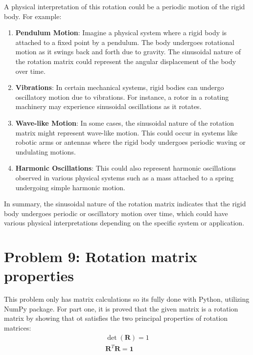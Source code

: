 \documentclass[conference]{IEEEtran}
\begin{document}
A physical interpretation of this rotation could be a periodic motion of the rigid body. For example:

\begin{enumerate}
    \item \textbf{Pendulum Motion}: Imagine a physical system where a rigid body is attached to a fixed point by a pendulum. The body undergoes rotational motion as it swings back and forth due to gravity. The sinusoidal nature of the rotation matrix could represent the angular displacement of the body over time.
    
    \item \textbf{Vibrations}: In certain mechanical systems, rigid bodies can undergo oscillatory motion due to vibrations. For instance, a rotor in a rotating machinery may experience sinusoidal oscillations as it rotates.
    
    \item \textbf{Wave-like Motion}: In some cases, the sinusoidal nature of the rotation matrix might represent wave-like motion. This could occur in systems like robotic arms or antennas where the rigid body undergoes periodic waving or undulating motions.
    
    \item \textbf{Harmonic Oscillations}: This could also represent harmonic oscillations observed in various physical systems such as a mass attached to a spring undergoing simple harmonic motion.
\end{enumerate}

In summary, the sinusoidal nature of the rotation matrix indicates that the rigid body undergoes periodic or oscillatory motion over time, which could have various physical interpretations depending on the specific system or application.

\vspace{12px}
\section{Problem 9: Rotation matrix properties}
This problem only has matrix calculations so its fully done with Python, utilizing NumPy package. For part one, it is proved that the given matrix is a rotation matrix by showing that ot satisfies the two principal properties of rotation matrices:
\begin{align}
    \det(\mathbf{R}) = 1 \\
    \mathbf{R}^T \mathbf{R} = \mathbf{1}
\end{align}
\end{document}
